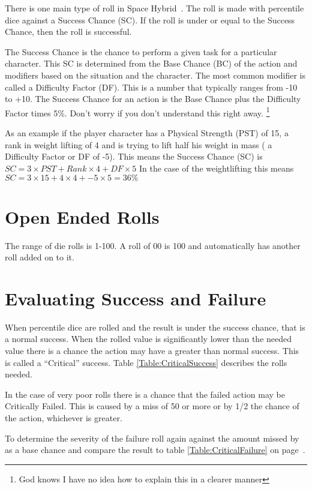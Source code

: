 There is one main type of roll in Space Hybrid\ . The roll is 
made with percentile dice against a Success Chance (SC). If the roll 
is under or equal to the Success Chance, then the roll is successful.

The Success Chance is the chance to perform a given task for a particular
character. This SC is determined from the Base Chance (BC) of the action 
and modifiers based on the situation and the character. The most common 
modifier is called a Difficulty Factor (DF). This is a number that typically 
ranges from -10 to +10. The Success Chance for an action is the Base Chance plus 
the Difficulty Factor times 5\%. Don't worry if you don't understand 
this right away. \footnote{God knows I have no idea how to explain 
this in a clearer manner}

As an example if the player character has a Physical Strength (PST) of 15, a rank in 
weight lifting of 4 and is trying to lift half his weight in mass ( a Difficulty Factor or DF of -5). 
This means the Success Chance (SC) is $ SC = 3 \times PST + Rank \times 4 + DF \times 5 $
In the case of the weightlifting this means $ SC = 3 \times 15 + 4 \times 4 + -5 \times 5  = 36\% $

\section{Open Ended Rolls}

The range of die rolls is 1-100. A roll of 00 is 100 and 
automatically has another roll added on to it.

\section{Evaluating Success and Failure}

When percentile dice are rolled and the result is under the success chance, that
is a normal success. When the rolled value is significantly lower than the needed 
value there is a chance the action may have a greater than normal success. This is 
called a ``Critical'' success. Table \ref{Table:CriticalSuccess} describes the 
rolls needed.



In the case of very poor rolls there is a chance that the failed action 
may be Critically Failed. This is caused by a miss of 50 or more or by 
1/2 the chance of the action, whichever is greater.

To determine the severity of the failure roll again against the 
amount missed by as a base chance and compare the result to table 
\ref{Table:CriticalFailure} on page~\pageref{Table:CriticalFailure}.


